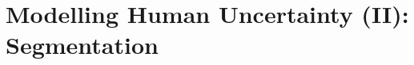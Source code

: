 \chapter{Modelling Human Uncertainty (II): Segmentation} \label{chapter:humanuncertainty_seg}

%




